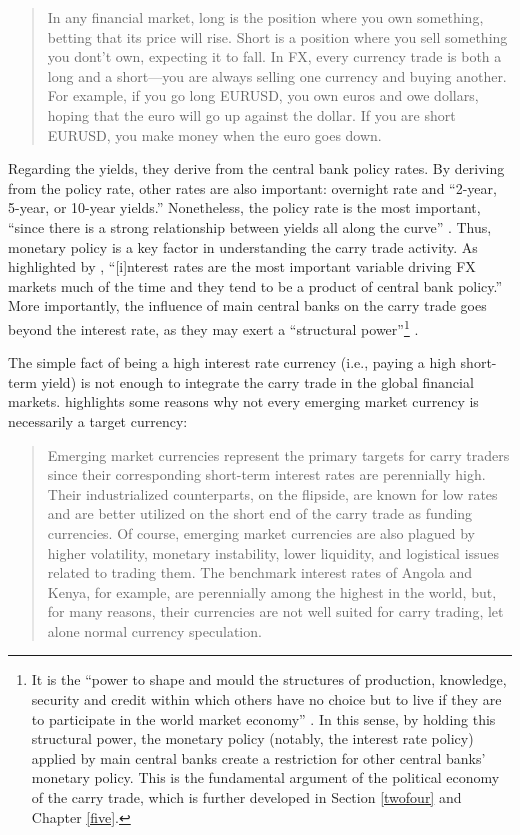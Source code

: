 \documentclass[a4paper, twoside]{templates/ociamthesis}
\begin{document}
\begin{quote}
In any financial market, long is the position where you own something, betting that its price will rise. Short is a position where you sell something you dont't own, expecting it to fall. In FX, every currency trade is both a long and a short---you are always selling one currency and buying another.\\
For example, if you go long EURUSD, you own euros and owe dollars, hoping that the euro will go up against the dollar. If you are short EURUSD, you make money when the euro goes down.
\end{quote}

Regarding the yields, they derive from the central bank policy rates. By deriving from the policy rate, other rates are also important: overnight rate and ``2-year, 5-year, or 10-year yields.'' \autocite[ 43]{donnelly2019} Nonetheless, the policy rate is the most important, ``since there is a strong relationship between yields all along the curve'' \autocite[ 43]{donnelly2019}. Thus, monetary policy is a key factor in understanding the carry trade activity. As highlighted by \textcite[ 82]{donnelly2019}, ``{[}i{]}nterest rates are the most important variable driving FX markets much of the time and they tend to be a product of central bank policy.'' More importantly, the influence of main central banks on the carry trade goes beyond the interest rate, as they may exert a ``structural power''\footnote{It is the ``power to shape and mould the structures of production, knowledge, security and credit within which others have no choice but to live if they are to participate in the world market economy'' \autocite[ 67]{strange1997}. In this sense, by holding this structural power, the monetary policy (notably, the interest rate policy) applied by main central banks create a restriction for other central banks' monetary policy. This is the fundamental argument of the political economy of the carry trade, which is further developed in Section \ref{twofour} and Chapter \ref{five}.} \autocite{strange1997}.

The simple fact of being a high interest rate currency (i.e., paying a high short-term yield) is not enough to integrate the carry trade in the global financial markets. \textcite[ 96]{kritzer2012} highlights some reasons why not every emerging market currency is necessarily a target currency:

\begin{quote}
Emerging market currencies represent the primary targets for carry traders since their corresponding short-term interest rates are perennially high. Their industrialized counterparts, on the flipside, are known for low rates and are better utilized on the short end of the carry trade as funding currencies. Of course, emerging market currencies are also plagued by higher volatility, monetary instability, lower liquidity, and logistical issues related to trading them. The benchmark interest rates of Angola and Kenya, for example, are perennially among the highest in the world, but, for many reasons, their currencies are not well suited for carry trading, let alone normal currency speculation.
\end{quote}
\end{document}
